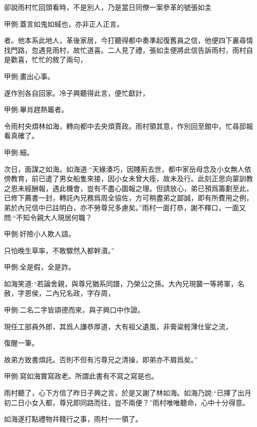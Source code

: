 \begin{parag}
    卻說雨村忙回頭看時，不是別人，乃是當日同僚一案參革的號張如圭\begin{note}甲側:蓋言如鬼如蜮也，亦非正人正言。\end{note}者。他本系此地人，革後家居，今打聽得都中奏準起復舊員之信，他便四下裏尋情找門路，忽遇見雨村，故忙道喜。二人見了禮，張如圭便將此信告訴雨村，雨村自是歡喜，忙忙的敘了兩句，\begin{note}甲側:畫出心事。\end{note}遂作別各自回家。冷子興聽得此言，便忙獻計，\begin{note}甲側:畢肖趕熱竈者。\end{note}令雨村央煩林如海，轉向都中去央煩賈政。雨村領其意，作別回至館中，忙尋邸報看真確了。\begin{note}甲側:細。\end{note}次日，面謀之如海。如海道:“天緣湊巧，因賤荊去世，都中家岳母念及小女無人依傍教育，前已遣了男女船隻來接，因小女未曾大痊，故未及行。此刻正思向蒙訓教之恩未經酬報，遇此機會，豈有不盡心圖報之理。但請放心，弟已預爲籌劃至此，已修下薦書一封，轉託內兄務爲周全協佐，方可稍盡弟之鄙誠，即有所費用之例，弟於內兄信中已註明白，亦不勞尊兄多慮矣。”雨村一面打恭，謝不釋口，一面又問:“不知令親大人現居何職？\begin{note}甲側:奸險小人欺人語。\end{note}只怕晚生草率，不敢驟然入都幹瀆。”\begin{note}甲側:全是假，全是詐。\end{note}如海笑道:“若論舍親，與尊兄猶系同譜，乃榮公之孫。大內兄現襲一等將軍，名赦，字恩侯，二內兄名政，字存周，\begin{note}甲側:二名二字皆頌德而來，與子興口中作證。\end{note}現任工部員外郎，其爲人謙恭厚道，大有祖父遺風，非膏粱輕薄仕宦之流，\begin{note}復醒一筆。\end{note}故弟方致書煩託。否則不但有污尊兄之清操，即弟亦不屑爲矣。”\begin{note}甲側:寫如海實寫政老。所謂此書有不寫之寫是也。\end{note}雨村聽了，心下方信了昨日子興之言，於是又謝了林如海。如海乃說:“已擇了出月初二日小女入都，尊兄即同路而往，豈不兩便？”雨村唯唯聽命，心中十分得意。
\end{parag}


\begin{parag}
    如海遂打點禮物幷餞行之事，雨村一一領了。
\end{parag}


